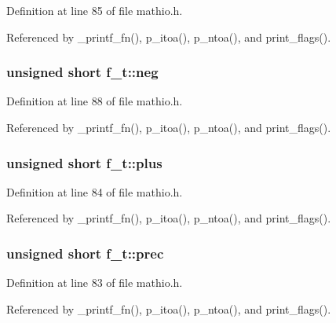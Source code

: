 Definition at line 85 of file mathio.\+h.



Referenced by \+\_\+printf\+\_\+fn(), p\+\_\+itoa(), p\+\_\+ntoa(), and print\+\_\+flags().

\subsubsection[{\texorpdfstring{neg}{neg}}]{\setlength{\rightskip}{0pt plus 5cm}unsigned short f\+\_\+t\+::neg}\hypertarget{unionf__t_a08d5e77f0fdb784ab1ef1425625e23f7}{}\label{unionf__t_a08d5e77f0fdb784ab1ef1425625e23f7}


Definition at line 88 of file mathio.\+h.



Referenced by \+\_\+printf\+\_\+fn(), p\+\_\+itoa(), p\+\_\+ntoa(), and print\+\_\+flags().

\subsubsection[{\texorpdfstring{plus}{plus}}]{\setlength{\rightskip}{0pt plus 5cm}unsigned short f\+\_\+t\+::plus}\hypertarget{unionf__t_a63ebe04d55417685e439b779dfa8dafe}{}\label{unionf__t_a63ebe04d55417685e439b779dfa8dafe}


Definition at line 84 of file mathio.\+h.



Referenced by \+\_\+printf\+\_\+fn(), p\+\_\+itoa(), p\+\_\+ntoa(), and print\+\_\+flags().

\subsubsection[{\texorpdfstring{prec}{prec}}]{\setlength{\rightskip}{0pt plus 5cm}unsigned short f\+\_\+t\+::prec}\hypertarget{unionf__t_afd9cfffafc044b616256b483e5444d92}{}\label{unionf__t_afd9cfffafc044b616256b483e5444d92}


Definition at line 83 of file mathio.\+h.



Referenced by \+\_\+printf\+\_\+fn(), p\+\_\+itoa(), p\+\_\+ntoa(), and print\+\_\+flags().

